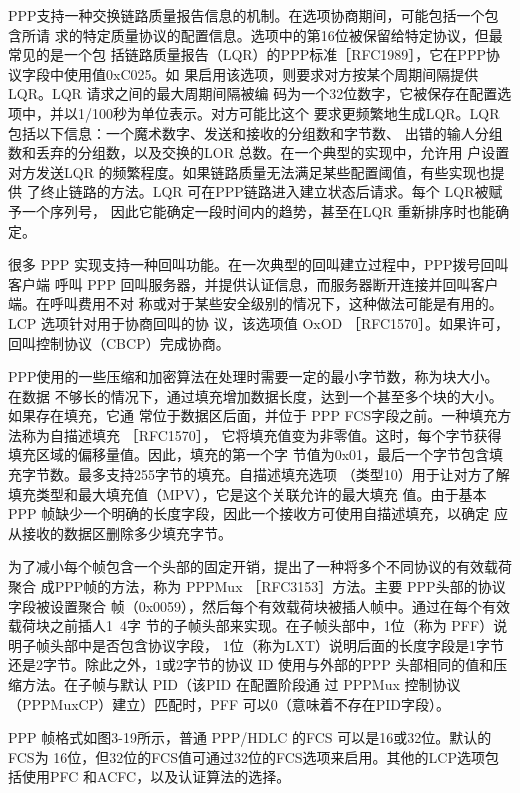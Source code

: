 PPP支持一种交换链路质量报告信息的机制。在选项协商期间，可能包括一个包含所请
求的特定质量协议的配置信息。选项中的第16位被保留给特定协议，但最常见的是一个包
括链路质量报告（LQR）的PPP标准［RFC1989］，它在PPP协议字段中使用值0xC025。如
果启用该选项，则要求对方按某个周期间隔提供LQR。LQR 请求之间的最大周期间隔被编
码为一个32位数字，它被保存在配置选项中，并以1/100秒为单位表示。对方可能比这个
要求更频繁地生成LQR。LQR 包括以下信息：一个魔术数字、发送和接收的分组数和字节数、
出错的输人分组数和丢弃的分组数，以及交换的LOR 总数。在一个典型的实现中，允许用
户设置对方发送LQR 的频繁程度。如果链路质量无法满足某些配置阈值，有些实现也提供
了终止链路的方法。LQR 可在PPP链路进入建立状态后请求。每个 LQR被赋予一个序列号，
因此它能确定一段时间内的趋势，甚至在LQR 重新排序时也能确定。

很多 PPP 实现支持一种回叫功能。在一次典型的回叫建立过程中，PPP拨号回叫客户端
呼叫 PPP 回叫服务器，并提供认证信息，而服务器断开连接并回叫客户端。在呼叫费用不对
称或对于某些安全级别的情况下，这种做法可能是有用的。LCP 选项针对用于协商回叫的协
议，该选项值 OxOD ［RFC1570］。如果许可，回叫控制协议（CBCP）完成协商。

PPP使用的一些压缩和加密算法在处理时需要一定的最小字节数，称为块大小。在数据
不够长的情况下，通过填充增加数据长度，达到一个甚至多个块的大小。如果存在填充，它通
常位于数据区后面，并位于 PPP FCS字段之前。一种填充方法称为自描述填充 ［RFC1570］，
它将填充值变为非零值。这时，每个字节获得填充区域的偏移量值。因此，填充的第一个字
节值为0x01，最后一个字节包含填充字节数。最多支持255字节的填充。自描述填充选项
（类型10）用于让对方了解填充类型和最大填充值（MPV），它是这个关联允许的最大填充
值。由于基本 PPP 帧缺少一个明确的长度字段，因此一个接收方可使用自描述填充，以确定
应从接收的数据区删除多少填充字节。

为了减小每个帧包含一个头部的固定开销，提出了一种将多个不同协议的有效载荷聚合
成PPP帧的方法，称为 PPPMux ［RFC3153］方法。主要 PPP头部的协议字段被设置聚合
帧（0x0059），然后每个有效载荷块被插人帧中。通过在每个有效载荷块之前插人1~4字
节的子帧头部来实现。在子帧头部中，1位（称为 PFF）说明子帧头部中是否包含协议字段，
1位（称为LXT）说明后面的长度字段是1字节还是2字节。除此之外，1或2字节的协议
ID 使用与外部的PPP 头部相同的值和压缩方法。在子帧与默认 PID（该PID 在配置阶段通
过 PPPMux 控制协议（PPPMuxCP）建立）匹配时，PFF 可以0（意味着不存在PID字段）。

PPP 帧格式如图3-19所示，普通 PPP/HDLC 的FCS 可以是16或32位。默认的FCS为
16位，但32位的FCS值可通过32位的FCS选项来启用。其他的LCP选项包括使用PFC
和ACFC，以及认证算法的选择。

